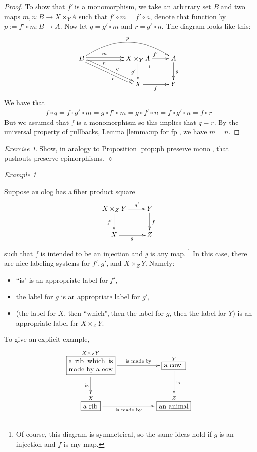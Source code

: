 \documentclass{book}
\makeatletter
\def\tn{\textnormal}
\def\to{\rightarrow}
\def\taking{\colon}
\newcommand{\LA}[2]{\ar[#1]^-{\tn {#2}}}
\newcommand{\LAL}[2]{\ar[#1]_-{\tn {#2}}}
\newcommand{\obox}[3]{\stackrel{#1}{\fbox{\parbox{#2}{#3}}}}
\def\ullimit{\ar@{}[rd]|(.3)*+{\lrcorner}}
\theoremstyle{remark}
\newtheorem{example}[subsubsection]{Example}
\newtheorem{exc}[subsubsection]{Exercise}
\newenvironment{exercise}{\begin{exc}}{\hspace*{\fill}$\lozenge$\end{exc}}
\theoremstyle{definition}
\makeatother
\begin{document}
\begin{proof}

To show that $f'$ is a monomorphism, we take an arbitrary set $B$ and two maps $m,n\taking B\to X\times_YA$ such that $f'\circ m=f'\circ n$, denote that function by $p:=f'\circ m\taking B\to A$. Now let $q=g'\circ m$ and $r=g'\circ n$. The diagram looks like this:
$$
\xymatrix{B\ar@<.5ex>[rr]^(.4)m\ar@<-.5ex>[rr]_(.4)n\ar@/^2pc/[rrr]^p\ar@<.5ex>[drr]^(.6)q\ar@<-.5ex>[drr]_(.6)r&&X\times_YA\ar[r]^{f'}\ar[d]_{g'}\ullimit&A\ar[d]^g\\&&X\ar[r]_f&Y}
$$
We have that 
\begin{align*}f\circ q=f\circ g'\circ m=g\circ f'\circ m=g\circ f'\circ n=f\circ g'\circ n=f\circ r\end{align*} 
But we assumed that $f$ is a monomorphism so this implies that $q=r$. By the universal property of pullbacks, Lemma \ref{lemma:up for fp}, we have $m=n$.

\end{proof}

\begin{exercise}
Show, in analogy to Proposition \ref{prop:pb preserve mono}, that pushouts preserve epimorphisms.
\end{exercise}

\begin{example}\label{exc:olog pullbacks}

Suppose an olog has a fiber product square
$$\xymatrix{X\times_ZY\ar[r]^-{g'}\ar[d]_{f'}&Y\ar[d]^f\\X\ar[r]_g&Z}$$ such that $f$ is intended to be an injection and $g$ is any map.
\footnote{Of course, this diagram is symmetrical, so the same ideas hold if $g$ is an injection and $f$ is any map.} 
In this case, there are nice labeling systems for $f', g'$, and $X\times_ZY$. Namely:
\begin{itemize}
\item ``is" is an appropriate label for $f'$, 
\item the label for $g$ is an appropriate label for $g'$,
\item (the label for $X$, then ``which", then the label for $g$, then the label for $Y$) is an appropriate label for $X\times_ZY$.
\end{itemize}

To give an explicit example, 
$$\xymatrix{
\obox{X\times_ZY}{.9in}{a rib which is made by a cow}\LA{rr}{is made by}\LAL{d}{is}&&\obox{Y}{.4in}{a cow}\LA{d}{is}\\
\obox{X}{.3in}{a rib}\LAL{rr}{is made by}&&\obox{Z}{.6in}{an animal}
}
$$

\end{example}
\end{document}
